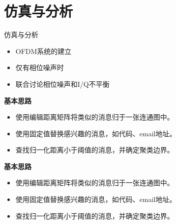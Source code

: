 \section{仿真与分析}
    
    \frame{\sectionpage}
    
    \begin{frame}{仿真与分析}
    \begin{itemize}
    	\item OFDM系统的建立
    	\item 仅有相位噪声时
    	
    	\item 联合讨论相位噪声和I/Q不平衡
    \end{itemize}
    \end{frame}

	\begin{frame}
		\begin{block}{\textbf{基本思路}}
			\begin{itemize}
				\item 使用编辑距离矩阵将类似的消息归于一张连通图中。
				\item 使用固定值替换感兴趣的消息，如代码、email地址。
				\item 查找归一化距离小于阈值的消息，并确定聚类边界。
			\end{itemize}
		\end{block}
	
		\begin{block}{\textbf{基本思路}}
			\begin{itemize}
				\item 使用编辑距离矩阵将类似的消息归于一张连通图中。
				\item 使用固定值替换感兴趣的消息，如代码、email地址。
				\item 查找归一化距离小于阈值的消息，并确定聚类边界。
			\end{itemize}
		\end{block}
	\end{frame}
    